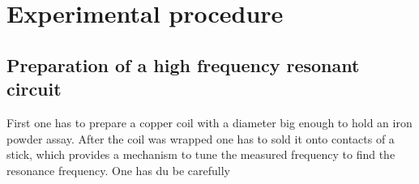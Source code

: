 \section{Experimental procedure}
	\subsection{Preparation of a high frequency resonant circuit}
    First one has to prepare a copper coil with a diameter big enough to hold an iron powder assay. After the coil was wrapped one has to sold it onto contacts of a stick, which provides a mechanism to tune the measured frequency to find the resonance frequency. One has du be carefully 
    \subsection{}
    
    \subsection{}
